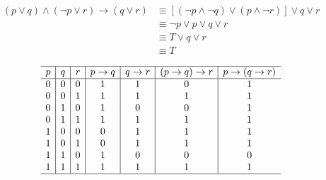 {{        %
        \begin{practices}
            \begin{align*}
                (p \vee q) \wedge (\neg p \vee r) \rightarrow (q \vee r)
                &\equiv [(\neg p \wedge \neg q) \vee (p \wedge \neg r)] \vee q \vee r \\
                &\equiv \neg p \vee p \vee q \vee r \\
                &\equiv T \vee q \vee r \\
                &\equiv T
            \end{align*}
        \end{practices}

        \begin{practices}
            \begin{table}[H]
                \[
                    \begin{array}{c|c|c|c|c|c|c}
                        \hline
                        p & q & r & p \rightarrow q & q \rightarrow r & (p \rightarrow q) \rightarrow r & p \rightarrow (q \rightarrow r) \\
                        \hline
                        0 & 0 & 0 & 1 & 1 & 0 & 1 \\
                        0 & 0 & 1 & 1 & 1 & 1 & 1 \\
                        0 & 1 & 0 & 1 & 0 & 0 & 1 \\
                        0 & 1 & 1 & 1 & 1 & 1 & 1 \\
                        1 & 0 & 0 & 0 & 1 & 1 & 1 \\
                        1 & 0 & 1 & 0 & 1 & 1 & 1 \\
                        1 & 1 & 0 & 1 & 0 & 0 & 0 \\
                        1 & 1 & 1 & 1 & 1 & 1 & 1 \\
                        \hline
                   \end{array}
               \]
            \end{table}
        \end{practices}

}}

